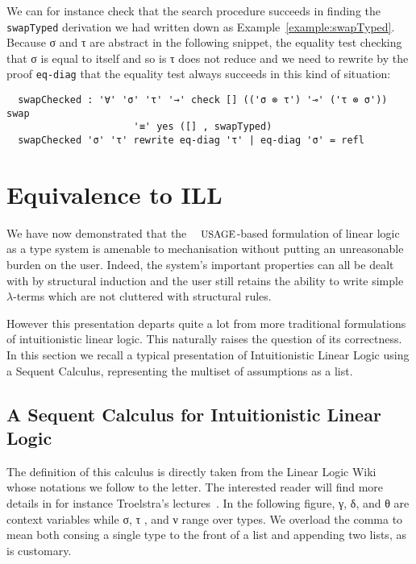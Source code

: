 \begin{example}We can for instance check that the search procedure
succeeds in finding the \texttt{swapTyped} derivation we had written down
as Example~\ref{example:swapTyped}. Because σ and τ are abstract in the
following snippet, the equality test checking that σ is equal to itself
and so is τ does not reduce and we need to rewrite by the proof
\texttt{eq-diag} that the equality test always succeeds in this kind of
situation:
\begin{lstlisting}
  swapChecked : '∀' 'σ' 'τ' '→' check [] (('σ ⊗ τ') '⊸' ('τ ⊗ σ')) swap
                      '≡' yes ([] , swapTyped)
  swapChecked 'σ' 'τ' rewrite eq-diag 'τ' | eq-diag 'σ' = refl
\end{lstlisting}
\end{example}



\section{Equivalence to ILL}\label{sec:equivalence}

We have now demonstrated that the $\Usages{}$-based formulation of
linear logic as a type system is amenable to mechanisation without
putting an unreasonable burden on the user. Indeed, the system's
important properties can all be dealt with by structural induction
and the user still retains the ability to write simple $λ$-terms
which are not cluttered with structural rules.

However this presentation departs quite a lot from more traditional
formulations of intuitionistic linear logic. This naturally raises
the question of its correctness. In this section we recall a typical
presentation of Intuitionistic Linear Logic using a Sequent Calculus,
representing the multiset of assumptions as a list.

\subsection{A Sequent Calculus for Intuitionistic Linear Logic}

The definition of this calculus is directly taken from the Linear Logic
Wiki~\cite{wiki:linearlogic} whose notations we follow to the letter.
The interested reader will find more details in for instance Troelstra's
lectures~\cite{troelstra1991lectures}. In the following figure, γ, δ,
and θ are context variables while σ, τ , and ν range over types. We
overload the comma to mean both consing a single type to the front
of a list and appending two lists, as is customary.

